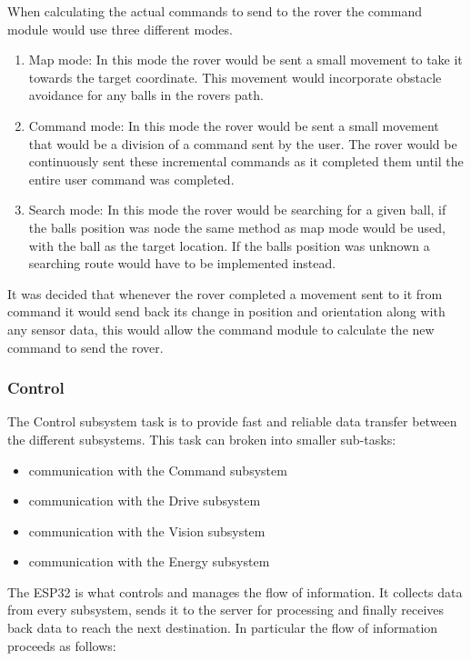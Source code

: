 \documentclass[10pt,twoside]{article}
\begin{document}
\smallbreak
When calculating the actual commands to send to the rover the command module would use three different modes.
\begin{enumerate}
  \item Map mode: In this mode the rover would be sent a small movement to take it towards the target coordinate. This movement would incorporate obstacle avoidance for any balls in the rovers path.
  \item Command mode: In this mode the rover would be sent a small movement that would be a division of a command sent by the user. The rover would be continuously sent these incremental commands as it completed them until the entire user command was completed.
  \item Search mode: In this mode the rover would be searching for a given ball, if the balls position was node the same method as map mode would be used, with the ball as the target location. If the balls position was unknown a searching route would have to be implemented instead.
\end{enumerate}
It was decided that whenever the rover completed a movement sent to it from command it would send back its change in position and orientation along with any sensor data, this would allow the command module to calculate the new command to send the rover.


\subsubsection{Control}

The Control subsystem task is to provide fast and reliable data
transfer between the different subsystems. 
\medskip
This task can broken into smaller sub-tasks:
\begin{itemize}
    \item communication with the Command subsystem
    \item communication with the Drive subsystem
    \item communication with the Vision subsystem
    \item communication with the Energy subsystem
\end{itemize}

The ESP32 is what controls and manages the flow of information. It collects data from every subsystem, sends it to the server for processing and finally receives back data to reach the next destination.
\smallbreak
In particular the flow of information proceeds as follows:
\end{document}

